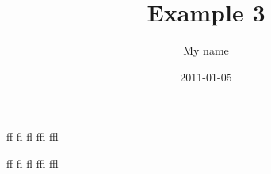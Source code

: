 \documentclass[a4paper,11pt]{article}
\title{Example 3}
\author{My name}
\date{2011-01-05}
\begin{document}
ff fi fl ffi ffl -- ---

f\/f f\/i f\/l f\/f\/i f\/f\/l -\/- -\/-\/-
\end{document}
